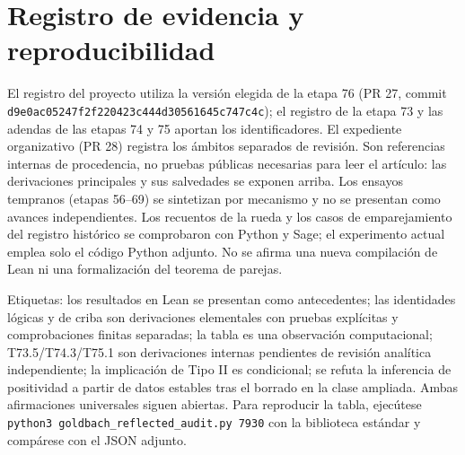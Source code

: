 \documentclass[11pt,a4paper]{article}
\newcommand{\B}[2]{#2}
\newcommand{\B}[2]{#1}
\begin{document}
\section{\B{Evidence record and reproducibility}{Registro de evidencia y reproducibilidad}}
\B{The project record uses the selected Stage 76 snapshot (PR 27, commit \texttt{d9e0ac05\allowbreak 247f2f22\allowbreak 0423c444\allowbreak d3056164\allowbreak 5c747c4c}); Stage 73's proof ledger and the Stage 74 and 75 deltas supply the theorem identifiers. The governance dossier (PR 28) records the separate review scopes. These are internal provenance references, not publicly accessible evidence required to read the paper: the principal derivations and their qualifications are printed above. Early project trials (stages 56--69) are consolidated by mechanism rather than recounted as independent advances. Fixed-wheel counts and matching fixtures in the historical record were checked in Python and Sage; the present experiment uses only the separately supplied Python source. No new Lean compilation or formalization of the pair theorem is represented.}{El registro del proyecto utiliza la versión elegida de la etapa 76 (PR 27, commit \texttt{d9e0ac05\allowbreak 247f2f22\allowbreak 0423c444\allowbreak d3056164\allowbreak 5c747c4c}); el registro de la etapa 73 y las adendas de las etapas 74 y 75 aportan los identificadores. El expediente organizativo (PR 28) registra los ámbitos separados de revisión. Son referencias internas de procedencia, no pruebas públicas necesarias para leer el artículo: las derivaciones principales y sus salvedades se exponen arriba. Los ensayos tempranos (etapas 56--69) se sintetizan por mecanismo y no se presentan como avances independientes. Los recuentos de la rueda y los casos de emparejamiento del registro histórico se comprobaron con Python y Sage; el experimento actual emplea solo el código Python adjunto. No se afirma una nueva compilación de Lean ni una formalización del teorema de parejas.}

\B{Evidence labels: the earlier Lean results are reported as prior results; the logical and finite-sieve identities are elementary derivations with explicit proofs and separate finite checks; the table is a computational observation; T73.5/T74.3/T75.1 are internal derivations pending independent analytical review; the Type II implication is conditional; the positivity inference from deletion-stable data in the enlarged class is refuted. Both universal assertions remain open. To reproduce the new table, run \texttt{python3 goldbach\_reflected\_audit.py 7930} with the standard library and compare with the supplied JSON.}{Etiquetas: los resultados en Lean se presentan como antecedentes; las identidades lógicas y de criba son derivaciones elementales con pruebas explícitas y comprobaciones finitas separadas; la tabla es una observación computacional; T73.5/T74.3/T75.1 son derivaciones internas pendientes de revisión analítica independiente; la implicación de Tipo II es condicional; se refuta la inferencia de positividad a partir de datos estables tras el borrado en la clase ampliada. Ambas afirmaciones universales siguen abiertas. Para reproducir la tabla, ejecútese \texttt{python3 goldbach\_reflected\_audit.py 7930} con la biblioteca estándar y compárese con el JSON adjunto.}
\end{document}
